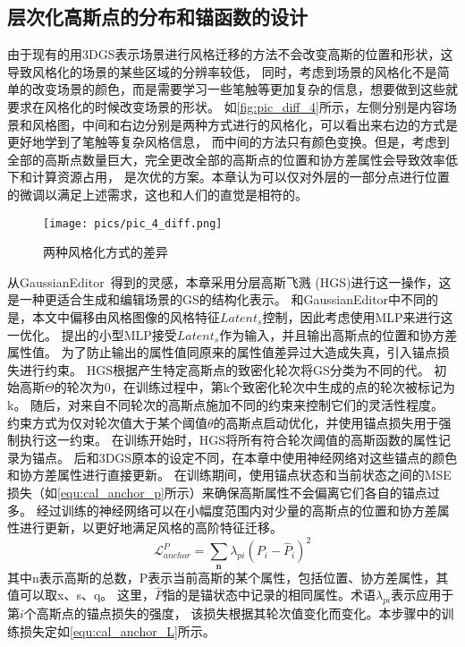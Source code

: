 \subsection{层次化高斯点的分布和锚函数的设计}
由于现有的用3DGS表示场景进行风格迁移的方法不会改变高斯的位置和形状，这导致风格化的场景的某些区域的分辨率较低，
同时，考虑到场景的风格化不是简单的改变场景的颜色，而是需要学习一些笔触等更加复杂的信息，想要做到这些就要求在风格化的时候改变场景的形状。
如\autoref{fig:pic_diff_4}所示，左侧分别是内容场景和风格图，中间和右边分别是两种方式进行的风格化，可以看出来右边的方式是更好地学到了笔触等复杂风格信息，
而中间的方法只有颜色变换。但是，考虑到全部的高斯点数量巨大，完全更改全部的高斯点的位置和协方差属性会导致效率低下和计算资源占用，
是次优的方案。本章认为可以仅对外层的一部分点进行位置的微调以满足上述需求，这也和人们的直觉是相符的。
\begin{figure}[htb]
    \centering
    \texttt{[image: pics/pic\_4\_diff.png]}
    \caption{\label{fig:pic_diff_4}两种风格化方式的差异}
\end{figure}
从GaussianEditor~\cite{chen2024gaussianeditor}得到的灵感，本章采用分层高斯飞溅 (HGS)进行这一操作，这是一种更适合生成和编辑场景的GS的结构化表示。
和GaussianEditor中不同的是，本文中偏移由风格图像的风格特征$Latent_s$控制，因此考虑使用MLP来进行这一优化。
提出的小型MLP接受$Latent_s$作为输入，并且输出高斯点的位置和协方差属性值。
为了防止输出的属性值同原来的属性值差异过大造成失真，引入锚点损失进行约束。
HGS根据产生特定高斯点的致密化轮次将GS分类为不同的代。
初始高斯$\Theta$的轮次为0，在训练过程中，第k个致密化轮次中生成的点的轮次被标记为k。
随后，对来自不同轮次的高斯点施加不同的约束来控制它们的灵活性程度。
约束方式为仅对轮次值大于某个阈值$\theta$的高斯点启动优化，并使用锚点损失用于强制执行这一约束。
在训练开始时，HGS将所有符合轮次阈值的高斯函数的属性记录为锚点。
后和3DGS原本的设定不同，在本章中使用神经网络对这些锚点的颜色和协方差属性进行直接更新。
在训练期间，使用锚点状态和当前状态之间的MSE损失（如\autoref{equ:cal_anchor_p}所示）来确保高斯属性不会偏离它们各自的锚点过多。
经过训练的神经网络可以在小幅度范围内对少量的高斯点的位置和协方差属性进行更新，以更好地满足风格的高阶特征迁移。
\begin{equation}
    \label{equ:cal_anchor_p}
    \mathcal{L}_{anchor}^P=\sum_{\mathbf{n}}\lambda_{pi}(P_i-\widehat{P}_i)^2
\end{equation}
其中n表示高斯的总数，P表示当前高斯的某个属性，包括位置、协方差属性，其值可以取x、s、q。
这里，$\widehat{P}$指的是锚状态中记录的相同属性。术语$\lambda_{pi}$表示应用于第$i$个高斯点的锚点损失的强度，
该损失根据其轮次值变化而变化。本步骤中的训练损失定如\autoref{equ:cal_anchor_L}所示。

